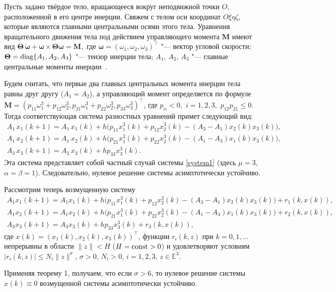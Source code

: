 \begin{example}[2]Пусть задано твёрдое тело, вращающееся вокруг
неподвижной точки $O$, расположенной в его центре инерции. Свяжем
с телом оси координат $O\xi\eta\zeta$, которые являются главными
центральными осями этого тела. Уравнения вращательного движения
тела под действием управляющего момента $\mathbf M$ имеют вид
$
\mathbf\Theta \,
\dot{\mathbf\omega}+\mathbf\omega\times\mathbf\Theta\mathbf\omega=\mathbf
M,
$
где $\mathbf \omega=(\omega_1, \omega_2, \omega_3)^\top$ "--- вектор
угловой скорости; $\mathbf\Theta=\mathop{\rm diag}\{A_1, A_2, A_3\}$ "--- тензор
инерции тела; $A_1$, $A_2$, $A_3$ "--- главные центральные моменты
инерции~\cite[c.~413--419]{sultan:bib11}.

Будем считать, что первые два главных центральных момента инерции
тела равны друг другу ($A_1=A_2$), а управляющий момент
определяется по формуле
 $\mathbf M=\left(p_{11}\omega_1^3+p_{12}\omega_2^3, p_{21}\omega_1^3+p_{22}\omega_2^3, p_{33}\omega_3^3\right)^\top$,
 где $p_{ii}<0,$ $i=1, 2, 3,$ $p_{12}p_{21}\leq0$.
Тогда соответствующая система разностных уравнений примет
следующий вид:
\begin{gather*}
A_1\,x_1(k+1)=A_1\,x_1(k)+h\Big(p_{11}x_1^3(k)+p_{12}x_2^3(k)-(A_3-A_1)x_2(k)x_3(k)\Big),\\
A_1\,x_2(k+1)=A_1\,x_2(k)+h\Big(p_{21}x_1^3(k)+p_{22}x_2^3(k)-(A_1-A_3)x_1(k)x_3(k)\Big),\\
A_3\,x_3(k+1)=A_3\,x_3(k)+h p_{33}x_3^3(k).
\end{gather*}
Эта система представляет собой частный случай системы
\eqref{system1} (здесь $\mu=3$, $\alpha=\beta=1$). Следовательно,
нулевое решение системы асимптотически устойчиво.

Рассмотрим теперь возмущенную систему
\begin{gather*}
A_1x_1(k{+}1){=}A_1x_1(k){+}h\Big(p_{11}x_1^3(k){+}p_{12}x_2^3(k){-}(A_3{-}A_1)x_2(k)x_3(k)\Big){+}r_1(k,x(k)),\\
A_1x_2(k{+}1)=A_1x_2(k){+}h\Big(p_{21}x_1^3(k){+}p_{22}x_2^3(k){-}(A_1{-}A_3)x_1(k)x_3(k)\Big){+}r_2(k,x(k)),\\
A_3x_3(k{+}1)=A_3x_3(k){+}h p_{33} x_3^3(k){+}r_3(k,x(k)),
\end{gather*}
где $x(k)=(x_1(k), x_2(k), x_3(k))^\top $, функции $r_i(k, z)$ при $k=0, 1, \ldots$
непрерывны в области $\|z\|<H$ ($H={\rm const}>0$) и удовлетворяют
условиям \mbox{$|r_i(k, z)|\leq N_i\|z\|^{\sigma}$}, $\sigma>0$, $N_i>0$,
$i=1, 2, 3$, $z\in\mathbb E^{3}$.

Применяя теорему 1, получаем, что если $\sigma>6$, то нулевое
решение системы $x(k)\equiv0$ возмущенной системы асимптотически устойчиво.
\end{example}

